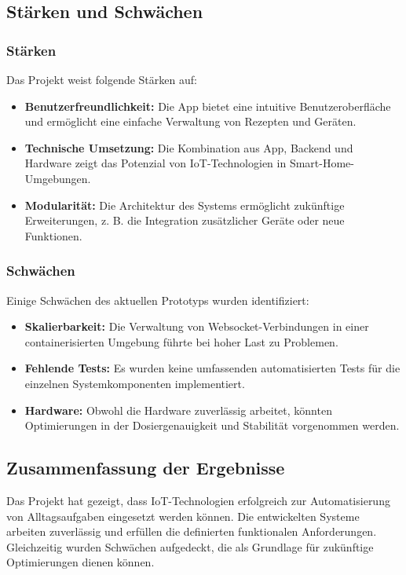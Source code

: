 \subsection{Stärken und Schwächen}

\subsubsection{Stärken}

Das Projekt weist folgende Stärken auf:
\begin{itemize}
  \item \textbf{Benutzerfreundlichkeit:} Die App bietet eine intuitive Benutzeroberfläche und 
  ermöglicht eine einfache Verwaltung von Rezepten und Geräten.
  \item \textbf{Technische Umsetzung:} Die Kombination aus App, Backend und Hardware zeigt das 
  Potenzial von IoT-Technologien in Smart-Home-Umgebungen.
  \item \textbf{Modularität:} Die Architektur des Systems ermöglicht zukünftige Erweiterungen, z. B. 
  die Integration zusätzlicher Geräte oder neue Funktionen.
\end{itemize}

\subsubsection*{Schwächen}

Einige Schwächen des aktuellen Prototyps wurden identifiziert:
\begin{itemize}
  \item \textbf{Skalierbarkeit:} Die Verwaltung von Websocket-Verbindungen in einer 
  containerisierten Umgebung führte bei hoher Last zu Problemen.
  \item \textbf{Fehlende Tests:} Es wurden keine umfassenden automatisierten Tests für die einzelnen 
  Systemkomponenten implementiert.
  \item \textbf{Hardware:} Obwohl die Hardware zuverlässig arbeitet, könnten Optimierungen in der 
  Dosiergenauigkeit und Stabilität vorgenommen werden.
\end{itemize}

\subsection{Zusammenfassung der Ergebnisse}

Das Projekt hat gezeigt, dass IoT-Technologien erfolgreich zur Automatisierung von Alltagsaufgaben 
eingesetzt werden können. Die entwickelten Systeme arbeiten zuverlässig und erfüllen die definierten 
funktionalen Anforderungen. Gleichzeitig wurden Schwächen aufgedeckt, die als Grundlage für 
zukünftige Optimierungen dienen können.

